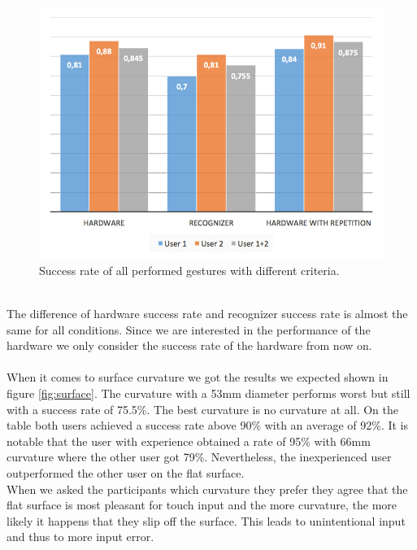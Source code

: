 \begin{figure}
\includegraphics[scale=0.35]{images/overallRecognition.jpg}
\caption{Success rate of all performed gestures with different criteria.}
\label{fig:overallRecognition}
\end{figure}
\\
The difference of hardware success rate and recognizer success rate is almost the same for all conditions. Since we are interested in the performance of the hardware we only consider the success rate of the hardware from now on. \\ \\
When it comes to surface curvature we got the results we expected shown in figure \ref{fig:surface}. The curvature with a 53mm diameter performs worst but still with a success rate of 75.5\%. The best curvature is no curvature at all. On the table both users achieved a success rate above 90\% with an average of 92\%. It is notable that the user with experience obtained a rate of 95\% with 66mm curvature where the other user got 79\%. Nevertheless, the inexperienced user outperformed the other user on the flat surface. 
\\
When we asked the participants which curvature they prefer they agree that the flat surface is most pleasant for touch input and the more curvature, the more likely it happens that they slip off the surface. This leads to unintentional input and thus to more input error. 
